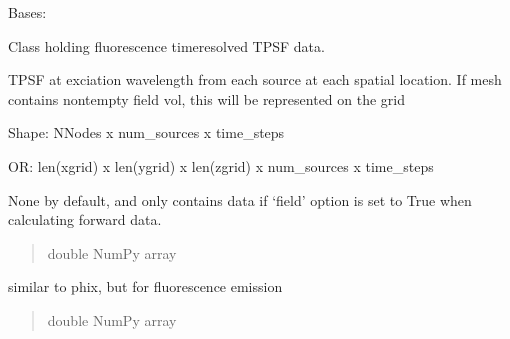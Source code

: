 \documentclass[letterpaper,10pt,english]{sphinxmanual}
\begin{document}
\begin{fulllineitems}
\label{\detokenize{_autosummary/nirfasterff.base.data.flTPSFdata:nirfasterff.base.data.flTPSFdata}}
\pysigstartsignatures
{}
\pysigstopsignatures
\sphinxAtStartPar
Bases: 

\sphinxAtStartPar
Class holding fluorescence time\sphinxhyphen{}resolved TPSF data.

\begin{fulllineitems}
\label{\detokenize{_autosummary/nirfasterff.base.data.flTPSFdata:nirfasterff.base.data.flTPSFdata.phix}}
\pysigstartsignatures
{}
\pysigstopsignatures
\sphinxAtStartPar
TPSF at exciation wavelength from each source at each spatial location. If mesh contains non\sphinxhyphen{}tempty field vol, this will be represented on the grid

\sphinxAtStartPar
Shape: NNodes x num\_sources x time\_steps

\sphinxAtStartPar
OR: len(xgrid) x len(ygrid) x len(zgrid) x num\_sources x time\_steps

\sphinxAtStartPar
None by default, and only contains data if ‘field’ option is set to True when calculating forward data.
\begin{quote}\begin{description}
\sphinxAtStartPar
double NumPy array

\end{description}\end{quote}

\end{fulllineitems}


\begin{fulllineitems}
\label{\detokenize{_autosummary/nirfasterff.base.data.flTPSFdata:nirfasterff.base.data.flTPSFdata.phifl}}
\pysigstartsignatures
{}
\pysigstopsignatures
\sphinxAtStartPar
similar to phix, but for fluorescence emission
\begin{quote}\begin{description}
\sphinxAtStartPar
double NumPy array


\end{description}
\end{quote}
\end{fulllineitems}
\end{fulllineitems}
\end{document}
